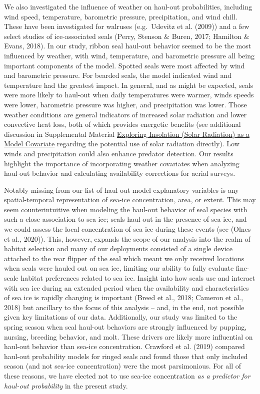 \documentclass[fleqn,10pt,lineno]{wlpeerj} %
\begin{document}
We also investigated the influence of weather on haul-out probabilities,
including wind speed, temperature, barometric pressure, precipitation, and wind
chill. These have been investigated for walruses (e.g.~Udevitz et al.
(2009)) and a few select studies of ice-associated seals
(Perry, Stenson \& Buren, 2017; Hamilton \& Evans, 2018). In our study, ribbon seal haul-out behavior seemed to be the most
influenced by weather, with wind, temperature, and barometric pressure all being
important components of the model. Spotted seals were most affected by wind and
barometric pressure. For bearded seals, the model indicated wind and temperature
had the greatest impact. In general, and as might be expected, seals were more
likely to haul-out when daily temperatures were warmer, winds speeds were lower,
barometric pressure was higher, and precipitation was lower. Those weather
conditions are general indicators of increased solar radiation and lower
convective heat loss, both of which provides energetic benefits (see additional
discussion in Supplemental Material \protect\hyperlink{exploring-insolation-solar-radiation-as-a-model-covariate}{Exploring Insolation (Solar Radiation) as a
Model Covariate} regarding the potential use of solar radiation directly). Low
winds and precipitation could also enhance predator detection. Our results
highlight the importance of incorporating weather covariates when analyzing
haul-out behavior and calculating availability corrections for aerial surveys.

Notably missing from our list of haul-out model explanatory variables is any
spatial-temporal representation of sea-ice concentration, area, or extent. This
may seem counterintuitive when modeling the haul-out behavior of seal species
with such a close association to sea ice; seals haul out in the presence of sea
ice, and we could assess the local concentration of sea ice during these events
(see (Olnes et al., 2020)). This, however, expands the scope of our analysis into the
realm of habitat selection and many of our deployments consisted of a single
device attached to the rear flipper of the seal which meant we only received
locations when seals were hauled out on sea ice, limiting our ability to fully
evaluate fine-scale habitat preferences related to sea ice. Insight into how
seals use and interact with sea ice during an extended period when the
availability and characteristics of sea ice is rapidly changing is important
(Breed et al., 2018; Cameron et al., 2018) but ancillary to the focus of this analysis -- and,
in the end, not possible given key limitations of our data. Additionally, our
study was limited to the spring season when seal haul-out behaviors are strongly
influenced by pupping, nursing, breeding behavior, and molt. These drivers are
likely more influential on haul-out behavior than sea-ice concentration.
Crawford et al. (2019) compared haul-out probability models for ringed
seals and found those that only included season (and not sea-ice concentration)
were the most parsimonious. For all of these reasons, we have elected not to use
sea-ice concentration \emph{as a predictor for haul-out probability} in the present
study.
\end{document}
